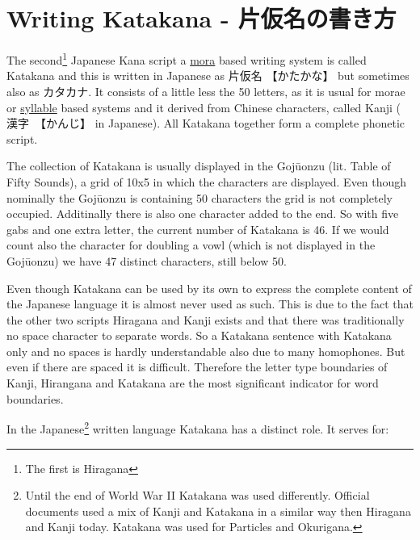 \chapter{Writing Katakana - 片仮名の書き方}

The second\footnote{The first is Hiragana} Japanese Kana script a
\hyperref[sec:Mora]{mora}  based writing system is called Katakana and this is
written in Japanese as {片仮名} {【かたかな】} but sometimes also as
{カタカナ}.  It consists of a little less the 50 letters, as it is usual for
morae or \hyperref[sec:Syllable]{syllable} based systems and it derived from
Chinese characters, called Kanji ( {漢字}　{【かんじ】} in Japanese). All
Katakana together form a complete phonetic script.

The collection of Katakana is usually displayed in the Gojūonzu (lit. Table of Fifty
Sounds), a grid of 10x5 in which the characters are displayed. Even though
nominally the Gojūonzu is containing 50 characters the grid is not completely occupied.
Additinally there is also one character added to the end. So with five gabs and
one extra letter, the current number of Katakana is 46. If we would count also
the character for doubling a vowl (which is not displayed in the Gojūonzu) we
have 47 distinct characters, still below 50. 



Even though Katakana can be used by its own to express the complete content of
the Japanese language it is almost never used as such. This is due to the fact
that the other two scripts Hiragana and Kanji exists and that there was
traditionally no space character to separate words. So a Katakana sentence with
Katakana only and no spaces is hardly understandable also due to many
homophones.  But even if there are spaced it is difficult. Therefore the letter
type boundaries of Kanji, Hirangana and Katakana are the most significant
indicator for word boundaries.

In the Japanese\footnote{Until the end of World War II Katakana was used
differently. Official documents used a mix of Kanji and Katakana in a similar
way then Hiragana and Kanji today. Katakana was used for Particles and
Okurigana.} written language Katakana has a distinct role. It serves for:

\bigskip

